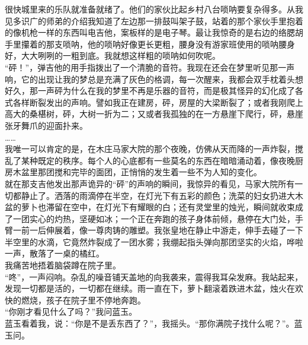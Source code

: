 很快城里来的乐队就准备就绪了。他们的家伙比起乡村八台唢呐要复杂得多。从我见多识广的师弟的介绍我知道了左边那一排鼓叫架子鼓，站着的那个家伙手里抱着的像机枪一样的东西叫电吉他，案板样的是电子琴。最让我惊奇的是右边的络腮胡手里攥着的那支唢呐，他的唢呐好像更长更粗，腰身没有游家班使用的唢呐腰身好，大大咧咧的一粗到底。我就想这样粗的唢呐如何吹呢。\\

“砰！”，弹吉他的用手指拨出了一个清脆的音符。我现在还会在梦里听见那一声响，它的出现让我的梦总是充满了灰色的格调，每一次醒来，我都会双手枕着头想好久，那一声砰为什么在我的梦里不再是乐器的音符，而是极其怪异的幻化成了各式各样断裂发出的声响。譬如我正在建房，砰，房屋的大梁断裂了；或者我刚爬上高大的桑椹树，砰，大树一折为二；又或者我孤独的在一方悬崖下爬行，砰，悬崖张牙舞爪的迎面扑来。\\

……\\

我唯一可以肯定的是，在木庄马家大院的那个夜晚，仿佛从天而降的一声炸裂，搅乱了某种既定的秩序。每个人的心底都有一些莫名的东西在暗暗涌动着，像夜晚厨房木盆里那团搅和完毕的面团，正悄悄的发生着一些不为人知的变化。\\

就在那支吉他发出那声诡异的“砰”的声响的瞬间，我惊异的看见，马家大院所有一切都静止了。洒落的雨滴停在半空，在灯光下有五彩的颜色；洗菜的妇女扔进大木盆的萝卜也滞留在空中，在灯光下有耀眼的白；还有灵堂里的烛光，瞬间就收束成了一团实心的灼热，坚硬如冰；一个正在奔跑的孩子身体前倾，悬停在大门处，手臂一前一后伸展着，像一尊肉铸的雕塑。我张皇地在静止中游走，伸手去碰了一下半空里的水滴，它竟然炸裂成了一团水雾；我绷起指头弹向那团坚实的火焰，哗啦一声，散落了一桌的橘红。\\

我痛苦地捂着脑袋蹲在院子里。\\

“咚”，一声闷响。杂乱的噪音铺天盖地的向我袭来，震得我耳朵发麻。我站起来，发现一切都是活的，一切都在继续。雨一直在下，萝卜翻滚着跌进木盆，烛火在欢快的燃烧，孩子在院子里不停地奔跑。\\

“你刚才看见什么了吗？”我问蓝玉。\\

蓝玉看着我，说：“你是不是丢东西了？”，我摇头。“那你满院子找什么呢？”。蓝玉问。\\
